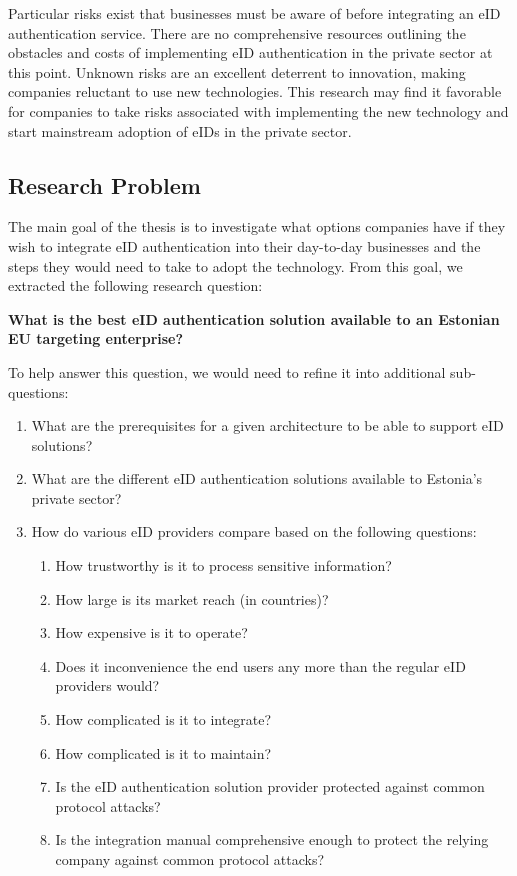 Particular risks exist that businesses must be aware of before integrating an eID authentication service. There are no comprehensive resources outlining the obstacles and costs of implementing eID authentication in the private sector at this point. Unknown risks are an excellent deterrent to innovation, making companies reluctant to use new technologies. This research may find it favorable for companies to take risks associated with implementing the new technology and start mainstream adoption of eIDs in the private sector.

\subsection{Research Problem}

The main goal of the thesis is to investigate what options companies have if they wish to integrate eID authentication into their day-to-day businesses and the steps they would need to take to adopt the technology. From this goal, we extracted the following research question:

\textbf{What is the best eID authentication solution available to an Estonian EU targeting enterprise?}

To help answer this question, we would need to refine it into additional sub-questions:

\begin{enumerate}
    \item What are the prerequisites for a given architecture to be able to support eID solutions?
    \item What are the different eID authentication solutions available to Estonia's private sector?
    \item How do various eID providers compare based on the following questions:
          \begin{enumerate}
              \item How trustworthy is it to process sensitive information?
              \item How large is its market reach (in countries)?
              \item How expensive is it to operate?
              \item Does it inconvenience the end users any more than the regular eID providers would?
              \item How complicated is it to integrate?
              \item How complicated is it to maintain?
              \item Is the eID authentication solution provider protected against common protocol attacks?
              \item Is the integration manual comprehensive enough to protect the relying company against common protocol attacks?
          \end{enumerate}
\end{enumerate}

